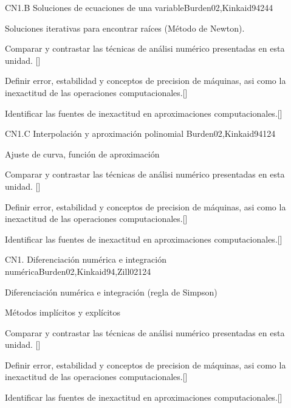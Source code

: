 \begin{syllabus}
\begin{unit}{}{CN1.B Soluciones de ecuaciones de una variable}{Burden02,Kinkaid94}{24}{4}
\begin{topics}
      \item Soluciones iterativas para encontrar raíces (Método de Newton).
   \end{topics}
   \begin{learningoutcomes}
      \item Comparar y contrastar las técnicas de análisi numérico presentadas en esta unidad. [\Usage]
      \item Definir error, estabilidad y conceptos de precision de máquinas, asi como la inexactitud de las operaciones computacionales.[\Usage]
      \item Identificar las fuentes de inexactitud en aproximaciones computacionales.[\Usage]
   \end{learningoutcomes}
\end{unit}

\begin{unit}{}{CN1.C Interpolación y aproximación polinomial }{Burden02,Kinkaid94}{12}{4}
\begin{topics}
      \item Ajuste de curva, función de aproximación
   \end{topics}

   \begin{learningoutcomes}
      \item Comparar y contrastar las técnicas de análisi numérico presentadas en esta unidad. [\Usage]
      \item Definir error, estabilidad y conceptos de precision de máquinas, asi como la inexactitud de las operaciones computacionales.[\Usage]
      \item Identificar las fuentes de inexactitud en aproximaciones computacionales.[\Usage]
   \end{learningoutcomes}
\end{unit}

\begin{unit}{}{CN1. Diferenciación numérica e integración numérica}{Burden02,Kinkaid94,Zill02}{12}{4}
\begin{topics}
      \item Diferenciación numérica e integración (regla de Simpson)
      \item Métodos implícitos y explícitos
   \end{topics}
   \begin{learningoutcomes}
       \item Comparar y contrastar las técnicas de análisi numérico presentadas en esta unidad. [\Usage]
      \item Definir error, estabilidad y conceptos de precision de máquinas, asi como la inexactitud de las operaciones computacionales.[\Usage]
      \item Identificar las fuentes de inexactitud en aproximaciones computacionales.[\Usage]
   \end{learningoutcomes}
\end{unit}


\end{syllabus}
